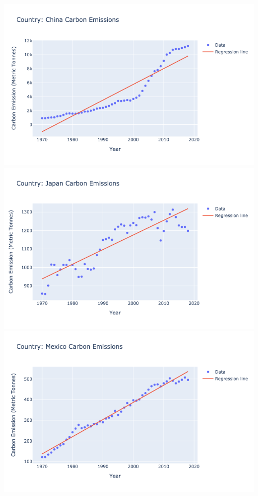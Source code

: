 \documentclass[fontsize=11pt]{article}
\begin{document}
    \includegraphics[scale=0.75]{china_linear.png}
    \includegraphics[scale=0.75]{japan_linear.png}
    \includegraphics[scale=0.75]{mexico_linear.png}
\end{document}
